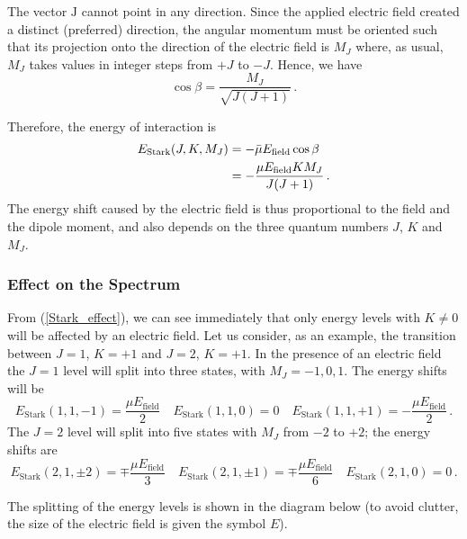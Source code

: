 \documentclass{article}
\theoremstyle{plain}\theoremheaderfont{\normalfont\itshape}\theorembodyfont{\rmfamily}\theoremseparator{.}\newtheorem*{rem}{Remark}\newtheorem*{ex}{Example}\newtheorem*{proof}{Proof}\newtheorem*{altp}{Alternative proof}
\theoremstyle{plain}\theoremheaderfont{\normalfont\bfseries}\theorembodyfont{\rmfamily}\theoremseparator{.}\newtheorem{thm}{Theorem}[section]\newtheorem{lem}[thm]{Lemma}\newtheorem{prop}[thm]{Proposition}\newtheorem*{cor}{Corollary}\newtheorem{defn}[thm]{Definition}\newtheorem{clm}[thm]{Claim}\newtheorem{clminproof}{Claim}\newtheorem{pos}{Postulate}[section]
\theoremstyle{break}\theoremheaderfont{\normalfont\itshape}\theorembodyfont{\rmfamily}\theoremseparator{.\medskip}\newtheorem*{proofskip}{Proof}\newtheorem*{exs}{Examples}\newtheorem*{rems}{Remarks}
\theoremstyle{break}\theoremheaderfont{\normalfont\bfseries}\theorembodyfont{\rmfamily}\theoremseparator{.\medskip}\newtheorem{lemskip}[thm]{Lemma}\newtheorem{defnskip}[thm]{Definition}\newtheorem{propskip}[thm]{Proposition}\newtheorem{thmskip}[thm]{Theorem}
\numberwithin{equation}{section}
\newcommand{\vb}[1]{\bm{\mathrm{#1}}}
\begin{document}
    The vector \(\vb{J}\) cannot point in any direction. Since the applied electric field created a distinct (preferred) direction, the angular momentum must be oriented such that its projection onto the direction of the electric field is \(M_J\) where, as usual, \(M_J\) takes values in integer steps from \(+J\) to \(-J\). Hence, we have
    \begin{equation}
        \cos\beta=\frac{M_J}{\sqrt{J(J+1)}}\,.
    \end{equation}

    Therefore, the energy of interaction is
    \begin{align}
        E_{\text{Stark}}(J,K,M_J)&=-\bar{\mu}E_{\text{field}}\cos\beta\notag\\
        &=-\frac{\mu E_{\text{field}}KM_J}{J(J+1)}\,.\label{Stark_effect}
    \end{align}
    The energy shift caused by the electric field is thus proportional to the field and the dipole moment, and also depends on the three quantum numbers \(J\), \(K\) and \(M_J\).
    
    \subsubsection{Effect on the Spectrum}
    From (\ref{Stark_effect}), we can see immediately that only energy levels with \(K\ne 0\) will be affected by an electric field. Let us consider, as an example, the transition between \(J=1\), \(K=+1\) and \(J=2\), \(K=+1\). In the presence of an electric field the \(J=1\) level will split into three states, with \(M_J=-1,0,1\). The energy shifts will be
    \begin{equation}
        E_{\text{Stark}}(1,1,-1)=\frac{\mu E_{\text{field}}}{2}\quad E_{\text{Stark}}(1,1,0)=0\quad E_{\text{Stark}}(1,1,+1)=-\frac{\mu E_{\text{field}}}{2}\,.
    \end{equation}
    The \(J=2\) level will split into five states with \(M_J\) from \(-2\) to \(+2\); the energy shifts are
    \begin{equation}
        E_{\text{Stark}}(2,1,\pm 2)=\mp\frac{\mu E_{\text{field}}}{3} \quad E_{\text{Stark}}(2,1,\pm 1)=\mp\frac{\mu E_{\text{field}}}{6} \quad E_{\text{Stark}}(2,1,0)=0\,.
    \end{equation}
    
    The splitting of the energy levels is shown in the diagram below (to avoid clutter, the size of the electric field is given the symbol \(E\)).
\end{document}
